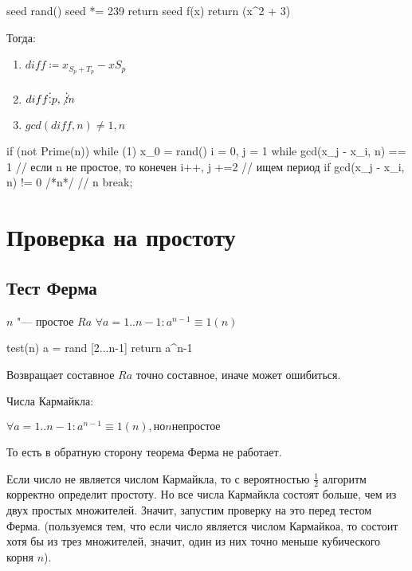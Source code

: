 \begin{cppcode}
seed
rand()
	seed *= 239
	return seed
f(x)
	return (x^2 + 3) %
\end{cppcode}

Тогда:
\begin{enumerate}
	\item $diff \coloneqq x_{S_p + T_p} - x{S_p}$
	\item $diff \vdots p, \not\vdots n$
	\item $gcd(diff, n) \neq 1, n$
\end{enumerate}

\begin{cppcode}
if (not Prime(n))
while (1)
	x_0 = rand()
	i = 0, j = 1
	while gcd(x_j - x_i, n) == 1	// если n не простое, то конечен
		i++, j +=2			// ищем период
	if gcd(x_j - x_i, n) != 0 /*n*/ 	// \log n
		break;
\end{cppcode}

\section{Проверка на простоту}

\subsection{Тест Ферма}

\begin{lemma}
$n$ "--- простое $Ra$ $ \forall a = 1 .. n-1: a^{n-1} \equiv 1 (n) $
\end{lemma}

\begin{cppcode}
test(n)
	a = rand [2...n-1]
	return a^{n-1} %
\end{cppcode}

Возвращает составное $Ra$ точно составное, иначе может ошибиться.

Числа Кармайкла:

$\forall a = 1 .. n-1: a^{n-1} \equiv 1 (n), но n не простое$

То есть в обратную сторону теорема Ферма не работает.

Если число не является числом Кармайкла, то с вероятностью $ \frac{1}{2} $ алгоритм корректно определит простоту. Но все числа Кармайкла состоят больше, чем из двух простых множителей. Значит, запустим проверку на это перед тестом Ферма. (пользуемся тем, что если число является числом Кармайкоа, то состоит хотя бы из трез множителей, значит, один из них точно меньше кубического корня $n$).

